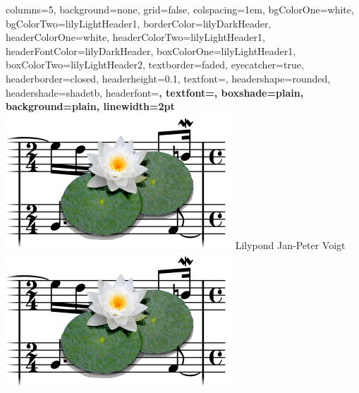 \documentclass[a0paper,landscape]{baposter}
\begin{document}
\begin{poster}{%
	columns=5,
	background=none,
	grid=false,
	colspacing=1em,
	bgColorOne=white,
	bgColorTwo=lilyLightHeader1,
	borderColor=lilyDarkHeader,
	headerColorOne=white,
	headerColorTwo=lilyLightHeader1,
	headerFontColor=lilyDarkHeader,
	boxColorOne=lilyLightHeader1,
	boxColorTwo=lilyLightHeader2,
	textborder=faded,
	eyecatcher=true,
	headerborder=closed,
	headerheight=0.1\textheight,
    textfont=\sc, %
	headershape=rounded,
	headershade=shadetb,
    headerfont=\Large\bf\textsc, %
    textfont={\setlength{\parindent}{1.5em}},
	boxshade=plain,
	background=plain,
	linewidth=2pt
	}
  {
  	\includegraphics[width=0.14\linewidth]{double-lily-modified3.png}
  }
  {Lilypond}
  {Jan-Peter Voigt}
  {\includegraphics[width=.14\textwidth]{double-lily-modified3.png}}

  
\end{poster}
\end{document}
